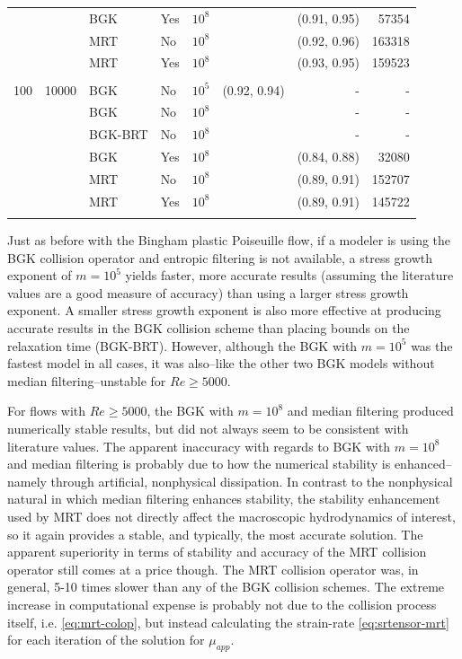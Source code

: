 \documentclass{article}
\begin{document}
\begin{table}
\begin{tabulary}{\linewidth}{r r l l r r r r}
    &      & BGK     & Yes & $10^8$ &              & (0.91, 0.95) & 57354 \\
    &      & MRT     & No  & $10^8$ &              & (0.92, 0.96) & 163318 \\
    &      & MRT     & Yes & $10^8$ &              & (0.93, 0.95) & 159523 \\
\\
100 & 10000 & BGK     & No  & $10^5$ & (0.92, 0.94) & - & - \\
    &       & BGK     & No  & $10^8$ &              & - & - \\
    &       & BGK-BRT & No  & $10^8$ &              & - & - \\
    &       & BGK     & Yes & $10^8$ &              & (0.84, 0.88) & 32080 \\
    &       & MRT     & No  & $10^8$ &              & (0.89, 0.91) & 152707 \\
    &       & MRT     & Yes & $10^8$ &              & (0.89, 0.91) & 145722 \\
\\
\end{tabulary}
\label{tab:lid-bing100}
\end{table}

Just as before with the Bingham plastic Poiseuille flow, if a modeler is using the BGK collision operator and entropic filtering is not available, a stress growth exponent of $m = 10^5$ yields faster, more accurate results (assuming the literature values are a good measure of accuracy) than using a larger stress growth exponent.
A smaller stress growth exponent is also more effective at producing accurate results in the BGK collision scheme than placing bounds on the relaxation time (BGK-BRT).
However, although the BGK with $m = 10^5$ was the fastest model in all cases, it was also--like the other two BGK models without median filtering--unstable for $Re \ge 5000$.

For flows with $Re \ge 5000$, the BGK with $m = 10^8$ and median filtering produced numerically stable results, but did not always seem to be consistent with literature values.
The apparent inaccuracy with regards to BGK with $m = 10^8$ and median filtering is probably due to how the numerical stability is enhanced--namely through artificial, nonphysical dissipation.
In contrast to the nonphysical natural in which median filtering enhances stability, the stability enhancement used by MRT does not directly affect the macroscopic hydrodynamics of interest, so it again provides a stable, and typically, the most accurate solution. %
The apparent superiority in terms of stability and accuracy of the MRT collision operator still comes at a price though.
The MRT collision operator was, in general, 5-10 times slower than any of the BGK collision schemes.
The extreme increase in computational expense is probably not due to the collision process itself, i.e. \eqref{eq:mrt-colop}, but instead calculating the strain-rate \eqref{eq:srtensor-mrt} for each iteration of the solution for $\mu_{app}$.
\end{document}
